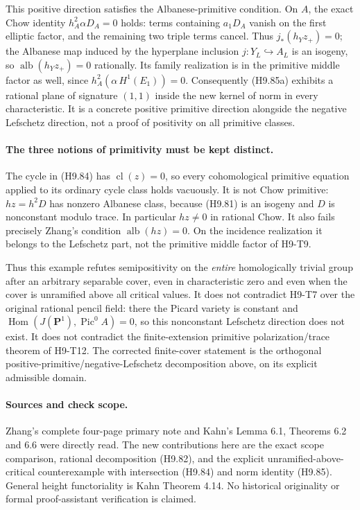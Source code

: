 \documentclass[11pt,a4paper]{article}
\begin{document}
This positive direction satisfies the Albanese-primitive condition.
On $A$, the exact Chow identity
$h_A^2\alpha D_A=0$ holds: terms containing $a_1D_A$ vanish on
the first elliptic factor, and the remaining two triple terms
cancel. Thus $j_*(h_Yz_+)=0$; the Albanese map induced by the
hyperplane inclusion $j:Y_L\hookrightarrow A_L$ is an isogeny,
so $\operatorname{alb}(h_Yz_+)=0$ rationally. Its family
realization is in the primitive middle factor as well, since
$h_A^2(\alpha\,H^1(E_1))=0$.
Consequently (H9.85a) exhibits a rational plane of signature
$(1,1)$ inside the new kernel of norm in every characteristic.
It is a concrete positive primitive direction alongside the
negative Lefschetz direction, not a proof of positivity on all
primitive classes.

\paragraph{The three notions of primitivity must be kept distinct.}
The cycle in (H9.84) has $\operatorname{cl}(z)=0$, so every
cohomological primitive equation applied to its ordinary cycle
class holds vacuously. It is not Chow primitive: $hz=h^2D$ has
nonzero Albanese class, because (H9.81) is an isogeny and $D$ is
nonconstant modulo trace. In particular $hz\ne0$ in rational Chow.
It also fails precisely Zhang's condition
$\operatorname{alb}(hz)=0$. On the incidence realization it belongs
to the Lefschetz part, not the primitive middle factor of H9-T9.

Thus this example refutes semipositivity on the \emph{entire}
homologically trivial group after an arbitrary separable cover,
even in characteristic zero and even when the cover is unramified
above all critical values. It does not contradict H9-T7 over the
original rational pencil field: there the Picard variety is
constant and $\operatorname{Hom}(J(\mathbf P^1),\operatorname{Pic}^0A)=0$,
so this nonconstant Lefschetz direction does not exist. It does not
contradict the finite-extension primitive polarization/trace theorem
of H9-T12. The corrected finite-cover statement is the orthogonal
positive-primitive/negative-Lefschetz decomposition above, on its
explicit admissible domain.

\paragraph{Sources and check scope.}
Zhang's complete four-page primary note and Kahn's Lemma 6.1,
Theorems 6.2 and 6.6 were directly read. The new contributions here
are the exact scope comparison, rational decomposition (H9.82),
and the explicit unramified-above-critical counterexample with
intersection (H9.84) and norm identity (H9.85). General height
functoriality is Kahn Theorem 4.14. No historical originality or
formal proof-assistant verification is claimed.
\end{document}
